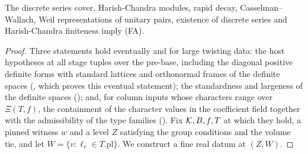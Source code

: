 \begin{lemma}\label{pf:bundles:lem:FA}
The discrete series cover, Harish-Chandra modules, rapid decay, Casselman--Wallach, Weil representations of unitary pairs, existence of
discrete series and Harish-Chandra finiteness imply (FA).
\end{lemma}

\begin{proof}
Three statements hold eventually and for large twisting data: the host hypotheses at all stage tuples over the pre-base, including the
diagonal positive definite forms with standard lattices and orthonormal frames of the definite spaces
(, which proves this eventual statement); the standardness and largeness of the
definite spaces (); and, for column inputs whose characters range
over $\Xi(T,f)$, the containment of the character values in the coefficient field together with the admissibility of the type families
(). Fix $\mathcal K,B,f,T$ at which they hold, a pinned witness $w$ and a level
$Z$ satisfying the group conditions and the volume tie, and let $W=\{v:\ell_v\in T.\mathrm{pl}\}$. We construct a fine real datum at $(Z,W)$.


\end{proof}
